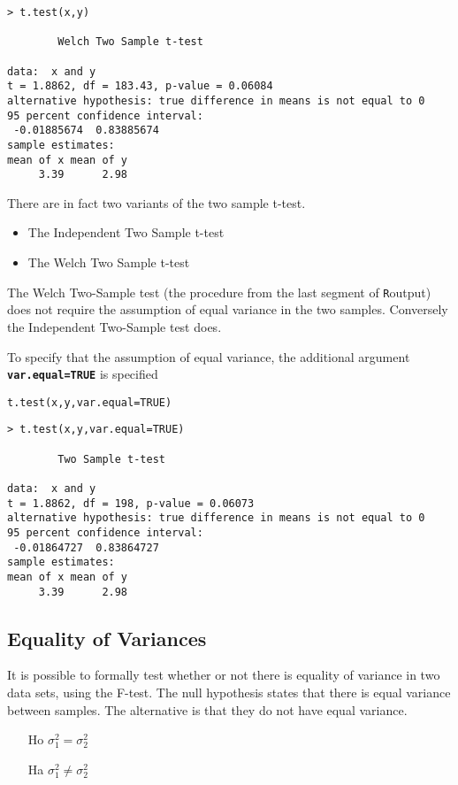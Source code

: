 \begin{verbatim}
> t.test(x,y)

        Welch Two Sample t-test

data:  x and y
t = 1.8862, df = 183.43, p-value = 0.06084
alternative hypothesis: true difference in means is not equal to 0
95 percent confidence interval:
 -0.01885674  0.83885674
sample estimates:
mean of x mean of y
     3.39      2.98
\end{verbatim}
There are in fact two variants of the two sample t-test.
\begin{itemize}
\item The Independent Two Sample t-test
\item The Welch Two Sample t-test
\end{itemize}
The Welch Two-Sample test (the procedure from the last segment of \texttt{R}output) does not require the assumption of equal variance in the two samples. Conversely the Independent Two-Sample test does.

To specify that the assumption of equal variance, the additional argument \textbf{\texttt{var.equal=TRUE}} is specified

\begin{framed}
\begin{verbatim}
t.test(x,y,var.equal=TRUE)
\end{verbatim}

\end{framed}

\begin{verbatim}
> t.test(x,y,var.equal=TRUE)

        Two Sample t-test

data:  x and y
t = 1.8862, df = 198, p-value = 0.06073
alternative hypothesis: true difference in means is not equal to 0
95 percent confidence interval:
 -0.01864727  0.83864727
sample estimates:
mean of x mean of y
     3.39      2.98
\end{verbatim}

\subsection{Equality of Variances}
It is possible to formally test whether or not there is equality of variance in two data sets, using the F-test.
The null hypothesis states that there is equal variance between samples. The alternative is that they do not have equal variance.
\begin{itemize}
\item[Ho] $\sigma^2_1 = \sigma^2_2$
\item[Ha] $\sigma^2_1 \neq \sigma^2_2$
\end{itemize}

